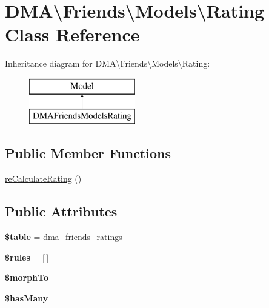 \hypertarget{classDMA_1_1Friends_1_1Models_1_1Rating}{}\section{D\+M\+A\textbackslash{}Friends\textbackslash{}Models\textbackslash{}Rating Class Reference}
\label{classDMA_1_1Friends_1_1Models_1_1Rating}
Inheritance diagram for D\+M\+A\textbackslash{}Friends\textbackslash{}Models\textbackslash{}Rating\+:\begin{figure}[H]
\begin{center}
\leavevmode
\includegraphics[height=2.000000cm]{d5/d4a/classDMA_1_1Friends_1_1Models_1_1Rating}
\end{center}
\end{figure}
\subsection*{Public Member Functions}
\begin{DoxyCompactItemize}
\item 
\hyperlink{classDMA_1_1Friends_1_1Models_1_1Rating_a1d30c619da71a91528a7dcee5411304a}{re\+Calculate\+Rating} ()
\end{DoxyCompactItemize}
\subsection*{Public Attributes}
\begin{DoxyCompactItemize}
\item 
\hypertarget{classDMA_1_1Friends_1_1Models_1_1Rating_a2f46a2d8d8a552ad56ec1f51f48943aa}{}{\bfseries \$table} = \textquotesingle{}dma\+\_\+friends\+\_\+ratings\textquotesingle{}\label{classDMA_1_1Friends_1_1Models_1_1Rating_a2f46a2d8d8a552ad56ec1f51f48943aa}

\item 
\hypertarget{classDMA_1_1Friends_1_1Models_1_1Rating_a6fcd508e1b61205e9e123df22631b629}{}{\bfseries \$rules} = \mbox{[}$\,$\mbox{]}\label{classDMA_1_1Friends_1_1Models_1_1Rating_a6fcd508e1b61205e9e123df22631b629}

\item 
{\bfseries \$morph\+To}
\item 
{\bfseries \$has\+Many}
\end{DoxyCompactItemize}
